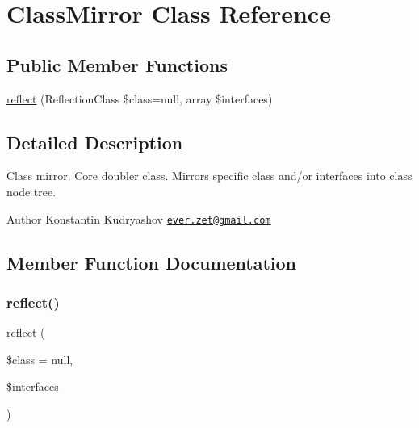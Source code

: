 \hypertarget{class_prophecy_1_1_doubler_1_1_generator_1_1_class_mirror}{}\section{Class\+Mirror Class Reference}
\label{class_prophecy_1_1_doubler_1_1_generator_1_1_class_mirror}
\subsection*{Public Member Functions}
\begin{DoxyCompactItemize}
\item 
\mbox{\hyperlink{class_prophecy_1_1_doubler_1_1_generator_1_1_class_mirror_a1081ef387ca38f4106fc0728959af0be}{reflect}} (Reflection\+Class \$class=null, array \$interfaces)
\end{DoxyCompactItemize}


\subsection{Detailed Description}
Class mirror. Core doubler class. Mirrors specific class and/or interfaces into class node tree.

\begin{DoxyAuthor}{Author}
Konstantin Kudryashov \href{mailto:ever.zet@gmail.com}{\tt ever.\+zet@gmail.\+com} 
\end{DoxyAuthor}


\subsection{Member Function Documentation}
\mbox{\label{class_prophecy_1_1_doubler_1_1_generator_1_1_class_mirror_a1081ef387ca38f4106fc0728959af0be}} 
\subsubsection{\texorpdfstring{reflect()}{reflect()}}
{\footnotesize\ttfamily reflect (\begin{DoxyParamCaption}\item[{Reflection\+Class}]{\$class = {\ttfamily null},  }\item[{array}]{\$interfaces }\end{DoxyParamCaption})}

